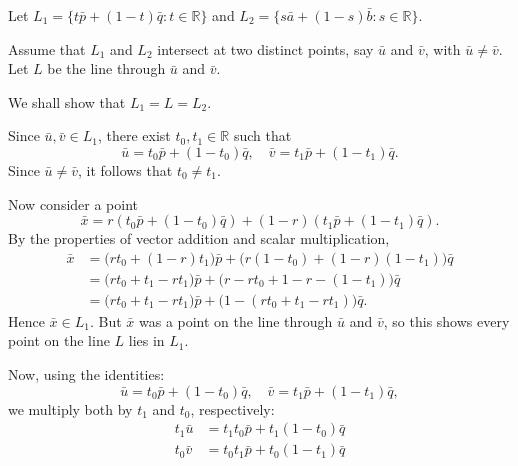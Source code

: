 
\begin{proofbox}
Let \( L_1 = \{ t\bar{p} + (1 - t)\bar{q} : t \in \mathbb{R} \} \)  
and \( L_2 = \{ s\bar{a} + (1 - s)\bar{b} : s \in \mathbb{R} \} \).  

Assume that \( L_1 \) and \( L_2 \) intersect at two distinct points, say \( \bar{u} \) and \( \bar{v} \),  
with \( \bar{u} \ne \bar{v} \). Let \( L \) be the line through \( \bar{u} \) and \( \bar{v} \).  

We shall show that \( L_1 = L = L_2 \).  

\vspace{1em}

Since \( \bar{u}, \bar{v} \in L_1 \), there exist \( t_0, t_1 \in \mathbb{R} \) such that  
\[
\bar{u} = t_0\bar{p} + (1 - t_0)\bar{q}, \quad
\bar{v} = t_1\bar{p} + (1 - t_1)\bar{q}.
\]
Since \( \bar{u} \ne \bar{v} \), it follows that \( t_0 \ne t_1 \).  

\vspace{1em}

Now consider a point
\[
\bar{x} = r(t_0\bar{p} + (1 - t_0)\bar{q}) + (1 - r)(t_1\bar{p} + (1 - t_1)\bar{q}).
\]
By the properties of vector addition and scalar multiplication,
\begin{align*}
\bar{x}
&= \big( rt_0 + (1 - r)t_1 \big) \bar{p}
+ \big( r(1 - t_0) + (1 - r)(1 - t_1) \big) \bar{q} \\
&= \big( rt_0 + t_1 - rt_1 \big) \bar{p}
+ \big( r - rt_0 + 1 - r - (1 - t_1) \big) \bar{q} \\
&= \big( rt_0 + t_1 - rt_1 \big) \bar{p}
+ \big( 1 - (rt_0 + t_1 - rt_1) \big) \bar{q}.
\end{align*}
Hence \( \bar{x} \in L_1 \). But \( \bar{x} \) was a point on the line through \( \bar{u} \) and \( \bar{v} \),  
so this shows every point on the line \( L \) lies in \( L_1 \).  

\vspace{1em}

Now, using the identities:
\[
\bar{u} = t_0\bar{p} + (1 - t_0)\bar{q}, \quad
\bar{v} = t_1\bar{p} + (1 - t_1)\bar{q},
\]
we multiply both by \( t_1 \) and \( t_0 \), respectively:
\begin{align*}
t_1\bar{u} &= t_1t_0\bar{p} + t_1(1 - t_0)\bar{q} \tag{A} \\
t_0\bar{v} &= t_0t_1\bar{p} + t_0(1 - t_1)\bar{q} \tag{B}
\end{align*}


\end{proofbox}
